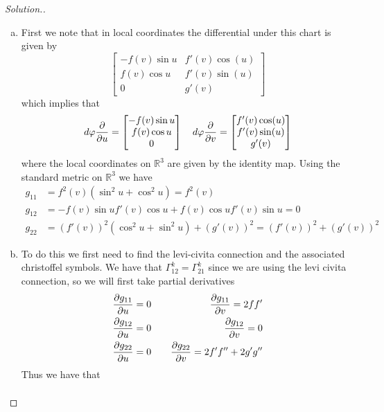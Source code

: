 \documentclass[a4paper]{article}
\begin{document}
\begin{proof}[Solution.]
  \begin{enumerate}[a)]
    \item First we note that in local coordinates the differential under this chart is given by
      \[
        \begin{bmatrix}
          -f(v)\sin u &  f'(v) \cos(u) \\
          f(v) \cos u & f'(v) \sin(u) \\
          0 & g'(v)
        \end{bmatrix}
      \]
      which implies that
      \[
        d \varphi \pdv{u} = 
        \begin{bmatrix}
          -f(v) \sin u \\
          f(v) \cos u \\
          0
        \end{bmatrix}
        \quad 
        d \varphi \pdv{v} = 
        \begin{bmatrix}
          f'(v)\cos(u) \\
          f'(v) \sin(u) \\
          g'(v)
        \end{bmatrix}
      \]
      where the local coordinates on $\mathds{R}^3$ are given by the identity map. Using the standard metric on $\mathds{R}^3$ we have
      \[
        \begin{aligned}
          g_{11} &= f^2(v) \left( \sin^2 u + \cos^2 u \right) = f^2(v) \\
          g_{12} &= -f(v)\sin u f'(v)\cos u + f(v)\cos u f'(v) \sin u = 0 \\
          g_{22} &= (f'(v))^2(\cos^2 u + \sin^2 u) + (g'(v))^2 = (f'(v))^2 + (g'(v))^2
        \end{aligned}
      \]
    \item To do this we first need to find the levi-civita connection and the associated christoffel symbols. We have that $\Gamma_{12}^k = \Gamma_{21}^k$ since we are using the levi civita connection, so we will first take partial derivatives
      \[
        \begin{aligned}
          &\pdv{g_{11}}{u} = 0 \quad &\pdv{g_{11}}{v} = 2ff' \\
          &\pdv{g_{12}}{u} = 0 \quad &\pdv{g_{12}}{v} = 0 \\
          &\pdv{g_{22}}{u} =  0 \quad &\pdv{g_{22}}{v} = 2f'f'' + 2g'g''
        \end{aligned}
      \]
      Thus we have that
      \[
        \begin{aligned}

\end{aligned}\]
\end{enumerate}
\end{proof}
\end{document}
